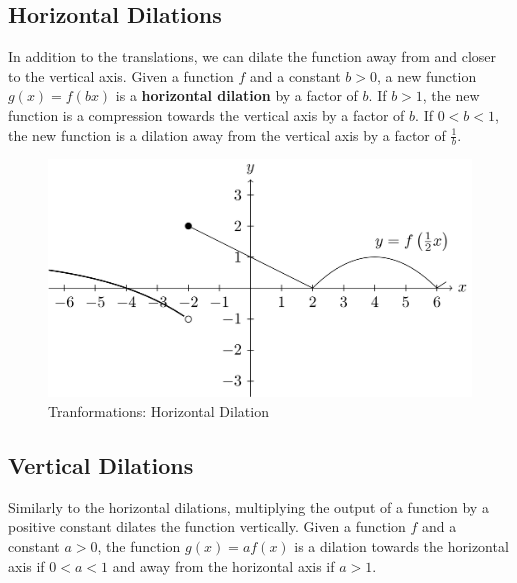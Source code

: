 \documentclass[
]{book}
\theoremstyle{definition}
\theoremstyle{definition}
\theoremstyle{definition}
\theoremstyle{remark}
\begin{document}
\hypertarget{horizontal-dilations}{%
\subsection{Horizontal Dilations}\label{horizontal-dilations}}

In addition to the translations, we can dilate the function away from and closer to the vertical axis. Given a function \(f\) and a constant \(b>0\), a new function \(g(x)=f(bx)\) is a \textbf{horizontal dilation} by a factor of \(b\). If \(b>1\), the new function is a compression towards the vertical axis by a factor of \(b\). If \(0<b<1\), the new function is a dilation away from the vertical axis by a factor of \(\frac{1}{b}\).

\begin{figure}

{\centering \includegraphics[width=0.8\linewidth]{tikz/horizontal-dilation} 

}

\caption{Tranformations: Horizontal Dilation}\label{fig:horizontal-dilation}
\end{figure}

\hypertarget{vertical-dilations}{%
\subsection{Vertical Dilations}\label{vertical-dilations}}

Similarly to the horizontal dilations, multiplying the output of a function by a positive constant dilates the function vertically. Given a function \(f\) and a constant \(a>0\), the function \(g(x)=a f(x)\) is a dilation towards the horizontal axis if \(0<a<1\) and away from the horizontal axis if \(a>1\).
\end{document}
